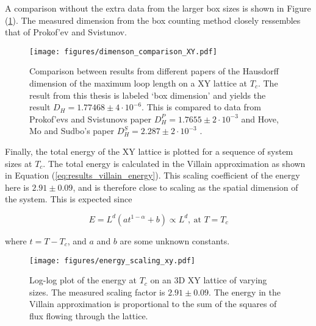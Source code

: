 \newpage

A comparison without the extra data from the larger box sizes is shown in Figure (\ref{fig:dim_comparison_xy}). The measured dimension from the box counting method closely ressembles that of Prokof'ev and Svistunov.

\begin{figure}[h!]
    \centering
        \texttt{[image: figures/dimenson\_comparison\_XY.pdf]}
    \caption{Comparison between results from different papers of the Hausdorff dimension of the maximum loop length on a XY lattice at $T_c$. The result from this thesis is labeled `box dimension' and yields the result $D_H = 1.77468 \pm 4 \cdot 10^{-6}$. This is compared to data from Prokof'evs and Svistunovs paper $D_H^P = 1.7655 \pm 2 \cdot 10^{-3}$ \cite{Prokofev:comment_on_hove_hausdorff_crit_fluct} and Hove, Mo and Sudbo's paper $D_H^S = 2.287 \pm 2 \cdot 10^{-3}$ \cite{Hove:hausdorff_crit_fluctuations}.}
    \label{fig:dim_comparison_xy}
\end{figure}

\newpage

Finally, the total energy of the XY lattice is plotted for a sequence of system sizes at $T_c$. The total energy is calculated in the Villain approximation as shown in Equation (\ref{eq:results_villain_energy}). This scaling coefficient of the energy here is $2.91 \pm 0.09$, and is therefore close to scaling as the spatial dimension of the system. This is expected since 

\begin{equation}
    E = L^d ( a t^{1 - \alpha} + b ) \propto L^d, \ \text{at $T = T_c$}
\end{equation}

where $t = T - T_c$, and $a$ and $b$ are some unknown constants.

\begin{figure}[h!]
    \centering
        \texttt{[image: figures/energy\_scaling\_xy.pdf]}
    \caption{Log-log plot of the energy at $T_c$ on an 3D XY lattice of varying sizes. The measured scaling factor is $2.91 \pm 0.09$. The energy in the Villain approximation is proportional to the sum of the squares of flux flowing through the lattice.}
    \label{fig:results_energyxy}
\end{figure}


